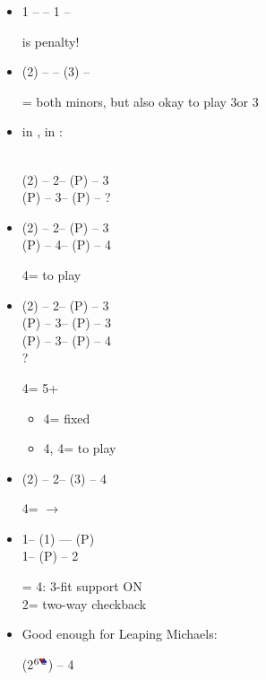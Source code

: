 \documentclass[12pt, a4paper]{article}
\begin{document}
\begin{itemize}
\item 1 -- \dbl -- 1 -- \dbl 

\dbl is penalty!

\item (2\spades) -- \dbl -- (3\spades) -- \dbl

\dbl = both minors, but also okay to play 3\spades\dbl or 3\nt

\item \gf in , \soff in :

 \\
(2\spades) -- 2\nt -- (P) -- 3\diams \\
(P) -- 3\hearts -- (P) -- ?

\item 
(2\hearts) -- 2\nt -- (P) -- 3\diams \\
(P) -- 4\diams -- (P) -- 4\nt

4\nt = to play

\item
(2\spades) -- 2\nt -- (P) -- 3\clubs \\
(P) -- 3\diams -- (P) -- 3\spades \\
(P) -- 3\nt -- (P) -- 4\clubs \\
?

4\clubs = 5+\clubs
\begin{itemize}
    \item 4\diams = \clubs fixed
    \item 4\hearts, 4\nt = to play
\end{itemize}

\item 
(2\hearts) -- 2\nt -- (3\hearts) -- 4\hearts 

4\hearts = $\rightarrow$ \spades

\item 
1\clubs -- (1\spades) --\dbl -- (P) \\
1\nt -- (P) -- 2\diams

\dbl = 4\hearts: 3-fit support ON\\
2\diams = two-way checkback

\item Good enough for Leaping Michaels:\\

(2\diams$^\text{6\major}$) -- 4\clubs




\end{itemize}
\end{document}
